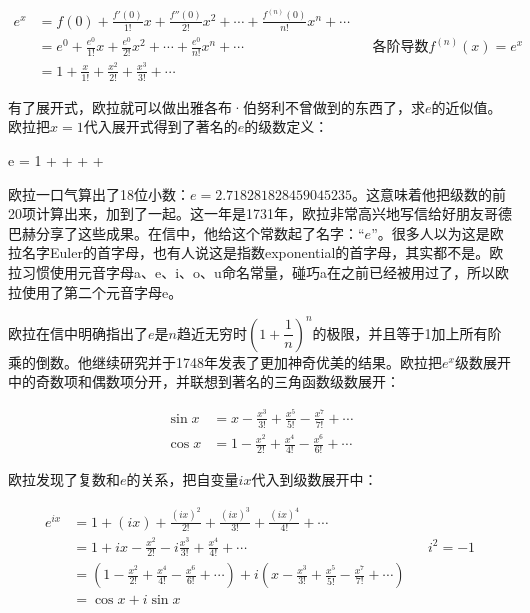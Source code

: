\documentclass[b5paper]{ctexart}
\begin{document}
\begin{align*}
e^x &= f(0) + \frac{f'(0)}{1!}x + \frac{f''(0)}{2!}x^2 + \dotsb + \frac{f^{(n)}(0)}{n!}x^n + \dotsb \\
  &= e^0 + \frac{e^0}{1!}x + \frac{e^{0}}{2!}x^2 + \dotsb + \frac{e^0}{n!}x^n + \dotsb && \text{各阶导数}f^{(n)}(x) = e^x \\
  &= 1 + \frac{x}{1!} + \frac{x^2}{2!} + \frac{x^3}{3!} + \dotsb
\end{align*}

有了展开式，欧拉就可以做出雅各布·伯努利不曾做到的东西了，求$e$的近似值。欧拉把$x = 1$代入展开式得到了著名的$e$的级数定义：

\be
e = 1 +  +  +  + \dotsb
\ee

欧拉一口气算出了18位小数：$e = 2.718281828459045235$。这意味着他把级数的前20项计算出来，加到了一起。这一年是1731年，欧拉非常高兴地写信给好朋友哥德巴赫分享了这些成果。在信中，他给这个常数起了名字：“$e$”。很多人以为这是欧拉名字Euler的首字母，也有人说这是指数exponential的首字母，其实都不是。欧拉习惯使用元音字母a、e、i、o、u命名常量，碰巧a在之前已经被用过了，所以欧拉使用了第二个元音字母e。

欧拉在信中明确指出了$e$是$n$趋近无穷时$(1 + \dfrac{1}{n})^n$的极限，并且等于1加上所有阶乘的倒数。他继续研究并于1748年发表了更加神奇优美的结果。欧拉把$e^x$级数展开中的奇数项和偶数项分开，并联想到著名的三角函数级数展开：

\begin{align*}
\sin x &= x - \frac{x^3}{3!} + \frac{x^5}{5!} - \frac{x^7}{7!} + \dotsb \\
\cos x &= 1 - \frac{x^2}{2!} + \frac{x^4}{4!} - \frac{x^6}{6!} + \dotsb
\end{align*}

欧拉发现了复数和$e$的关系，把自变量$ix$代入到级数展开中：

\begin{align*}
e^{ix} &= 1 + (ix) + \frac{(ix)^2}{2!} + \frac{(ix)^3}{3!} + \frac{(ix)^4}{4!} + \dotsb \\
  &= 1 + ix - \frac{x^2}{2!} - i\frac{x^3}{3!} + \frac{x^4}{4!} + \dotsb && i^2 = -1\\
  &= (1 - \frac{x^2}{2!} + \frac{x^4}{4!} - \frac{x^6}{6!} + \dotsb) + i(x - \frac{x^3}{3!} + \frac{x^5}{5!} - \frac{x^7}{7!} + \dotsb ) \\
  &= \cos x + i\sin x
\end{align*}
\end{document}
